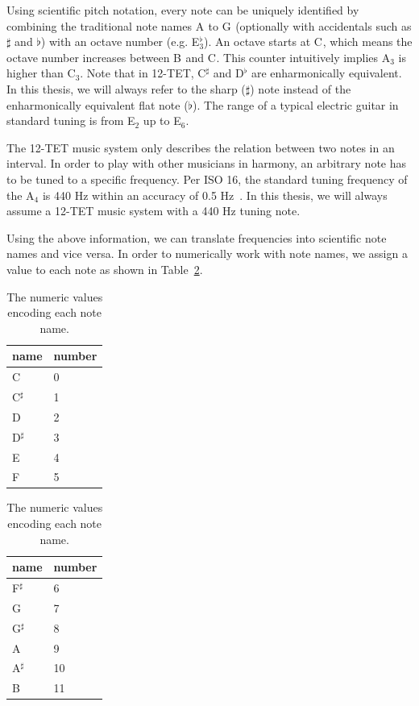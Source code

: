 \documentclass[a4paper,10pt,twocolumn]{article}
\newcommand{\note}[2]{#1${}_{#2}$}
\newcommand{\notesharp}[2]{#1${}_{#2}^{\sharp}$}
\newcommand{\noteflat}[2]{#1${}_{#2}^{\flat}$}
\begin{document}
Using scientific pitch notation, every note can be uniquely identified by combining the traditional note names \note{A}{} to \note{G}{} (optionally with accidentals such as $\sharp$ and $\flat$) with an octave number (e.g. \noteflat{E}{3}). An octave starts at \note{C}{}, which means the octave number increases between \note{B}{} and \note{C}{}. This counter intuitively implies \note{A}{3} is higher than \note{C}{3}. Note that in 12-TET, \notesharp{C}{} and \noteflat{D}{} are enharmonically equivalent. In this thesis, we will always refer to the sharp ($\sharp$) note instead of the enharmonically equivalent flat note ($\flat$). %
The range of a typical electric guitar in standard tuning is from \note{E}{2} up to \note{E}{6}.

The 12-TET music system only describes the relation between two notes in an interval. In order to play with other musicians in harmony, an arbitrary note has to be tuned to a specific frequency. Per ISO 16, the standard tuning frequency of the \note{A}{4} is 440 Hz within an accuracy of 0.5 Hz~\cite{isoa}. In this thesis, we will always assume a 12-TET music system with a 440 Hz tuning note.

Using the above information, we can translate frequencies into scientific note names and vice versa. In order to numerically work with note names, we assign a value to each note as shown in Table~\ref{tab:notenames}.
\begin{table}[h]
    \hfill
    \begin{center}
        \begin{tabular}
        {l|l}
            name & number \\
            \hline
            \note{C}{}      & 0 \\
            \notesharp{C}{} & 1 \\
            \note{D}{}      & 2 \\
            \notesharp{D}{} & 3 \\
            \note{E}{}      & 4 \\
            \note{F}{}      & 5
        \end{tabular}
        \qquad
        \begin{tabular}{l|l}
            name & number \\
            \hline
            \notesharp{F}{} & 6 \\
            \note{G}{}      & 7 \\
            \notesharp{G}{} & 8 \\
            \note{A}{}      & 9 \\
            \notesharp{A}{} & 10 \\
            \note{B}{}      & 11
        \end{tabular}
    \end{center}
    \hfill
    \caption{The numeric values encoding each note name.}
    \label{tab:notenames}
\end{table}
\end{document}
